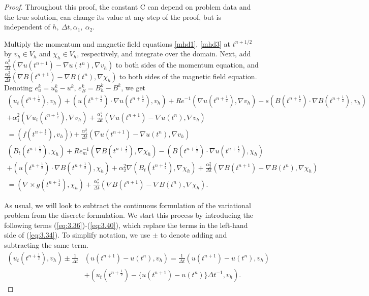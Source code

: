 \documentclass[11pt]{article}%
\numberwithin{equation}{section}
\def\grad{{\nabla}}
\def\nplushalf{{n+\frac12}}
\begin{document}
\begin{proof}
Throughout this proof, the constant C can depend on problem data and the true solution, can change its value at any step of the proof, but is independent of $h,\ \Delta t, \alpha_1,\ \alpha_2$.

Multiply the momentum and magnetic field equations  \eqref{mhd1}, \eqref{mhd3} at $t^{n+1/2}$ by $v_h\in V_h$ and $\chi_h \in V_h$, respectively, and
integrate over the domain.  Next, add $\frac{\alpha_1^2}{\Delta t}( \nabla u(t^{n+1}) - \nabla u(t^n),\nabla v_h)$ to both sides of the momentum equation, and $\frac{\alpha_2^2}{\Delta t}( \nabla B(t^{n+1}) - \nabla B(t^n),\nabla \chi_h)$ to both sides of the magnetic field equation.  Denoting $e^{k}_{u} = u^{k}_{h} - u^{k}$, $e^{k}_{B} = B^{k}_{h} - B^{k}$, we get
	\begin{multline}
	(u_{t}(t^{n+\frac{1}{2}}),v_{h}) + (u(t^{n+\frac{1}{2}})\cdot \grad{u}(t^{n+\frac{1}{2}}), v_{h}) + Re^{-1}(\grad{u}(t^{n+\frac{1}{2}}),\grad{v_{h}}) 
	 - s(B(t^{n+\frac{1}{2}})\cdot \grad{B}(t^{n+\frac{1}{2}}),v_{h})\\
	 +\alpha_1^2( \nabla u_{t}(t^{n+\frac{1}{2}}),\nabla v_h)
	+ \frac{\alpha_1^2}{\Delta t}( \nabla u(t^{n+1}) - \nabla u(t^n),\nabla v_h) \\
	 = (f(t^{n+\frac{1}{2}}),v_{h})  ) + \frac{\alpha_1^2}{\Delta t}( \nabla u(t^{n+1}) - \nabla u(t^n),\nabla v_h)
	\label{eq:3.34}
	\end{multline}
	\begin{multline}
	(B_{t}(t^{\nplushalf}),\chi_{h}) + Re^{-1}_{m}(\nabla B(t^{\nplushalf}),\grad{\chi_{h}}) - (B(t^{\nplushalf})\cdot \grad{u}(t^{\nplushalf}),\chi_{h}) \\
	 + (u(t^{\nplushalf})\cdot \grad{B}(t^{\nplushalf}),\chi_{h})+\alpha_2^2\nabla (B_{t}(t^{\nplushalf}),\nabla \chi_{h}) 
	 + \frac{\alpha_2^2}{\Delta t}( \nabla B(t^{n+1}) - \nabla B(t^n),\nabla \chi_h) \\
	 = (\nabla \times {g}(t^{\nplushalf}),\chi_{h}) + \frac{\alpha_2^2}{\Delta t}( \nabla B(t^{n+1}) - \nabla B(t^n),\nabla \chi_h).
	\label{eq:3.35}
	\end{multline}
	
	As usual, we will look to subtract the continuous formulation of the variational problem from the discrete formulation.  We start this process by introducing the following terms (\ref{eq:3.36})-(\ref{eq:3.40}), which replace the terms in the left-hand side of (\ref{eq:3.34}).  To simplify notation, we use $\pm$ to denote adding and subtracting the same term.
	\begin{equation}
	\begin{split}
	(u_{t}(t^{\nplushalf}),v_{h}) \pm \frac{1}{\Delta t}&(u(t^{n+1}) - u(t^{n}),v_{h}) = \frac{1}{\Delta t}(u(t^{n+1}) - u(t^{n}),v_{h}) \\
	& + (u_{t}(t^{\nplushalf}) - \{u(t^{n+1}) - u(t^{n})\}\Delta t^{-1},v_{h}).
	\end{split}
	\label{eq:3.36}
	\end{equation}


\end{proof}
\end{document}
